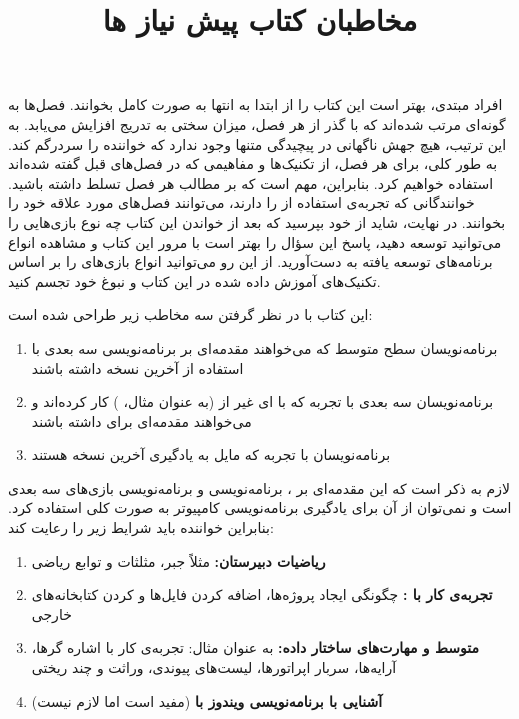 {
    \Large
    افراد مبتدی، بهتر است این کتاب را از ابتدا به انتها به صورت کامل بخوانند. فصل‌ها به گونه‌ای مرتب شده‌اند که با گذر از هر فصل، میزان سختی به تدریج افزایش می‌یابد. به این ترتیب، هیچ جهش ناگهانی در پیچیدگی متنها وجود ندارد که خواننده را سردرگم کند.
    به طور کلی، برای هر فصل، از تکنیک‌ها و مفاهیمی که در فصل‌های قبل گفته شده‌اند استفاده خواهیم کرد. بنابراین، مهم است که بر مطالب هر فصل تسلط داشته باشید.
    خوانندگانی که تجربه‌ی استفاده از  را دارند، می‌توانند فصل‌های مورد علاقه خود را بخوانند. در نهایت، شاید از خود بپرسید که بعد از خواندن این کتاب چه نوع بازی‌هایی را می‌توانید توسعه دهید، پاسخ این سؤال را بهتر است با مرور این کتاب و مشاهده انواع برنامه‌های توسعه یافته به دست‌آورید.
    از این رو می‌توانید انواع بازی‌های را بر اساس تکنیک‌های آموزش داده شده در این کتاب و نبوغ خود تجسم کنید.
}

\newpage

\title{
    \LARGE
    \textbf{مخاطبان کتاب}
}\rullFillWithLine[0.5em]{1pt}
\textbf{\vspace{12pt}}

{
    \Large
    این کتاب با در نظر گرفتن سه مخاطب زیر طراحی شده است:
    \begin{enumerate}
        \item {برنامه‌نویسان سطح متوسط  که می‌خواهند مقدمه‌ای بر برنامه‌نویسی سه بعدی با استفاده از آخرین نسخه  داشته باشند}
        \item {برنامه‌نویسان سه بعدی با تجربه که با ‌ای غیر از  (به عنوان مثال، ) کار کرده‌اند و می‌خواهند مقدمه‌ای برای  داشته باشند}
        \item {برنامه‌نویسان با تجربه  که مایل به یادگیری آخرین نسخه  هستند}
    \end{enumerate}
}
\textbf{\vspace{25pt}}

\title{
    \LARGE
    \textbf{پیش نیاز ها}
} \rullFillWithLine[0.5em]{1pt}
\textbf{\vspace{12pt}}

{
    \Large
    لازم به ذکر است که این مقدمه‌ای بر ، برنامه‌نویسی  و برنامه‌نویسی بازی‌های سه بعدی است و نمی‌توان از آن برای یادگیری برنامه‌نویسی کامپیوتر به صورت کلی استفاده کرد. بنابراین خواننده باید شرایط زیر را رعایت کند:
    \begin{enumerate}
        \item {\textbf{ریاضیات دبیرستان: } مثلاً جبر، مثلثات و توابع ریاضی}
        \item {\textbf{تجربه‌ی کار با :} چگونگی ایجاد پروژه‌ها، اضافه کردن فایل‌ها و  کردن کتابخانه‌های خارجی}
        \item {\textbf{ متوسط و مهارت‌های ساختار داده:} به عنوان مثال: تجربه‌ی کار با اشاره گر‌ها، آرایه‌ها، سربار اپراتور‌ها، لیست‌های پیوندی، وراثت و چند ریختی}
        \item {\textbf{آشنایی با برنامه‌نویسی ویندوز با } (مفید است اما لازم نیست)}
    \end{enumerate}
}
\textbf{\vspace{25pt}}

